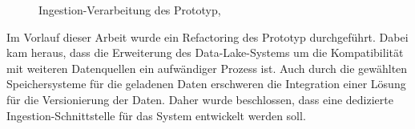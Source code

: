 \begin{figure}
    \centering
    \caption[Ingestion-Verarbeitung des Prototyp]{Ingestion-Verarbeitung des Prototyp, \textcite[Quelle:][S. 3]{prototyp}}
    \label{fig:prototyp-ingestion}
\end{figure}

Im Vorlauf dieser Arbeit wurde ein Refactoring des Prototyp durchgeführt.
Dabei kam heraus, dass die Erweiterung des Data-Lake-Systems um die Kompatibilität mit weiteren Datenquellen ein aufwändiger Prozess ist.
Auch durch die gewählten Speichersysteme für die geladenen Daten erschweren die Integration einer Lösung für die Versionierung der Daten.
Daher wurde beschlossen, dass eine dedizierte Ingestion-Schnittstelle für das System entwickelt werden soll.